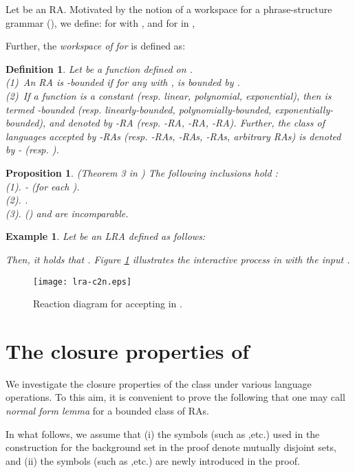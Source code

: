 \documentclass[preprint,fleqn,1p]{elsarticle}
\newtheorem{de}{Definition}
\newtheorem{prop}{Proposition}
\newtheorem{exam}{Example}
\begin{document}
Let  be an RA.  
Motivated by the notion of a workspace for a phrase-structure grammar (\cite{AS:73}), we define: for  with , and for  in ,

Further, the {\it workspace of}  {\it for}  is defined as:

 
\begin{de}{\rm Let   be a function defined on .\\
(1)\ An RA   is {\it -bounded} if for any  with ,    is bounded by . \\
(2)\ If a function  is a constant  (resp. linear, polynomial,  exponential), 
then   is termed -bounded (resp. linearly-bounded,  polynomially-bounded,  exponentially-bounded), and denoted by 
-RA (resp. -RA, -RA, -RA). Further, 
the class of languages accepted by -RAs (resp. -RAs,  -RAs, -RAs, arbitrary RAs) is denoted by - 
(resp. ). 
}
\end{de}

\begin{prop}{\rm (Theorem 3 in \cite{OKY:12})} The following inclusions hold {\rm :}  \\
{\rm (1)}. - {\rm (for each )}. \\
{\rm (2)}. . \\
{\rm (3)}.  {\rm (}{\rm )} and  are incomparable.
\label{prop-ra}
\end{prop}

\begin{exam} \rm{
Let   be an LRA defined  as follows:

Then, it holds that . Figure \ref{fig-c2n} illustrates the interactive process in  with the input . } \label{exam-c2n}
\end{exam}

\begin{figure}[t]
\centerline{
\texttt{[image: lra-c2n.eps]}}
\caption{Reaction diagram for accepting  in .}
\label{fig-c2n}
\end{figure}


\section{The closure properties of }

We investigate the closure properties of the class  under various language operations. To this aim, it is convenient to prove the following that one may call {\it normal form lemma} for a bounded class of RAs. 

In what follows, we assume that (i) the symbols (such as ,etc.) used in the construction for the background set in the proof denote mutually disjoint sets, and (ii) the symbols (such as ,etc.) are newly introduced in the proof.
\end{document}
